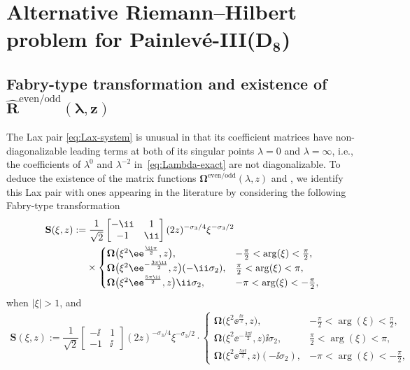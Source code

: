 \section[Alternative Riemann-Hilbert problem for Painlev\'e-III(D\_8)]{Alternative Riemann--Hilbert problem for Painlev\'e-III($\boldsymbol{D_8}$)}

\subsection[Fabry-type transformation and existence of Rhateven/odd(lambda,z)]{Fabry-type transformation and existence of $\boldsymbol{\widehat{R}^\mathrm{even/odd}(\lambda,z)}$} \label{sec:suleimanov-solution-connection}
The Lax pair \eqref{eq:Lax-system} is unusual in that its coefficient matrices have non-diagonalizable leading terms at both of its singular points $\lambda = 0$ and $\lambda = \infty$, i.e., the coefficients of $\lambda^0$ and $\lambda^{-2}$ in~\eqref{eq:Lambda-exact} are not diagonalizable. To deduce the existence of the matrix functions ${\mathbf{\Omega}}^{\mathrm{even/odd}}(\lambda, z)$ and , we identify this Lax pair with ones appearing in the literature by considering the following Fabry-type transformation
\begin{align}
&\mathbf{S}(\xi, z) := {\dfrac{1}{\sqrt{2}}} \begin{bmatrix} -\ii & 1\\ -1 &\ii \end{bmatrix} (2z)^{-\sigma_3/4} \xi^{-\sigma_3/2}\nonumber
\\
&\hphantom{\mathbf{S}(\xi, z) :=}{}
\times \begin{cases}
\mathbf \Omega\big(\xi^2 \ee^{\frac{\ii\pi}{2}}, z\big),& -\frac{\pi}{2}<\arg(\xi)<\frac{\pi}{2},\\
\mathbf \Omega\big(\xi^2 \ee^{-\frac{3\pi \ii}{2}}, z\big)(-\ii\sigma_2),& \frac{\pi}{2}<\arg(\xi)<\pi, \\
\mathbf \Omega\big(\xi^2 \ee^{\frac{5\pi \ii}{2}}, z\big)\ii\sigma_2,& -\pi<\arg(\xi)<-\frac{\pi}{2},
 \end{cases}
 \label{eq:fabry-1}
\end{align}
when $|\xi|>1$, and
\begin{gather}
\mathbf{S}(\xi, z) := {\dfrac{1}{\sqrt{2}}} \begin{bmatrix} -\ii & 1\\ -1 &\ii \end{bmatrix} (2z)^{-\sigma_3/4} \xi^{-\sigma_3/2}
\cdot \begin{cases}
\mathbf \Omega\big(\xi^2 \ee^{\frac{\ii\pi}{2}}, z\big),& -\frac{\pi}{2}<\arg(\xi)<\frac{\pi}{2},\\
\mathbf \Omega\big(\xi^2 \ee^{-\frac{3\pi \ii}{2}}, z\big)\ii\sigma_2,& \frac{\pi}{2}<\arg(\xi)<\pi, \\
\mathbf \Omega\big(\xi^2 \ee^{\frac{5\pi \ii}{2}}, z\big)(-\ii\sigma_2),& -\pi<\arg(\xi)<-\frac{\pi}{2},
 \end{cases}\!\!\!\!
 \label{eq:fabry-2}
\end{gather}
